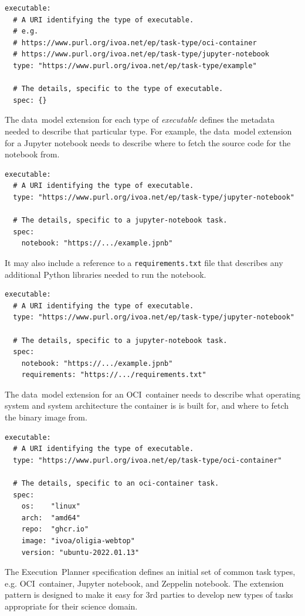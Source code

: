 \documentclass[11pt,a4paper]{ivoa}
\newcommand{\datamodel} {data~model}
\newcommand{\executionplanner} {Execution~Planner}
\newcommand{\jupyternotebook} {Jupyter notebook}
\newcommand{\python} {Python}
\newcommand{\zeppelin} {Zeppelin}
\newcommand{\ocicontainer} {OCI~container}
\newcommand{\codeword}[1] {\texttt{#1}}
\newcommand{\executable} {\textit{executable}}
\begin{document}
\begin{lstlisting}[]
executable:
  # A URI identifying the type of executable.
  # e.g.
  # https://www.purl.org/ivoa.net/ep/task-type/oci-container
  # https://www.purl.org/ivoa.net/ep/task-type/jupyter-notebook
  type: "https://www.purl.org/ivoa.net/ep/task-type/example"

  # The details, specific to the type of executable.
  spec: {}
\end{lstlisting}

The \datamodel{} extension for each type of \executable{} defines the metadata needed to
describe that particular type.
For example, the \datamodel{} extension for a \jupyternotebook{} needs to describe where
to fetch the source code for the notebook from.
\begin{lstlisting}[]
executable:
  # A URI identifying the type of executable.
  type: "https://www.purl.org/ivoa.net/ep/task-type/jupyter-notebook"

  # The details, specific to a jupyter-notebook task.
  spec:
    notebook: "https://.../example.jpnb"
\end{lstlisting}

It may also include a reference to a \codeword{requirements.txt} file that describes any additional \python{}
libraries needed to run the notebook.
\begin{lstlisting}[]
executable:
  # A URI identifying the type of executable.
  type: "https://www.purl.org/ivoa.net/ep/task-type/jupyter-notebook"

  # The details, specific to a jupyter-notebook task.
  spec:
    notebook: "https://.../example.jpnb"
    requirements: "https://.../requirements.txt"
\end{lstlisting}

The \datamodel{} extension for an \ocicontainer{} needs to describe what operating system and system architecture
the container is is built for, and where to fetch the binary image from.

\begin{lstlisting}[]
executable:
  # A URI identifying the type of executable.
  type: "https://www.purl.org/ivoa.net/ep/task-type/oci-container"

  # The details, specific to an oci-container task.
  spec:
    os:    "linux"
    arch:  "amd64"
    repo:  "ghcr.io"
    image: "ivoa/oligia-webtop"
    version: "ubuntu-2022.01.13"
\end{lstlisting}

The \executionplanner{} specification defines an initial set of common task types, e.g. \ocicontainer{}, \jupyternotebook{},
and \zeppelin{} notebook.
The extension pattern is designed to make it easy for 3rd parties to develop new types of tasks appropriate for their science domain.
\end{document}
